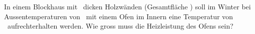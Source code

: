 In einem Blockhaus mit \dHO\ dicken Holzwänden (Gesamtfläche \AHO) soll im Winter bei Aussentemperaturen von \taO\ mit einem Ofen im Innern eine Temperatur von \tiO\ aufrechterhalten werden. Wie gross muss die Heizleistung des Ofens sein?

